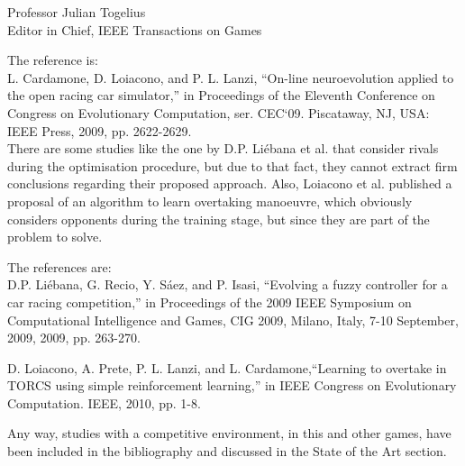 \documentclass[10pt]{letter} %
\begin{document}
\begin{letter}{Professor Julian Togelius \\ Editor in Chief, IEEE Transactions on Games}
\begin{enumerate}
\begin{itemize}
\begin{itemize}
The reference is:\\
L. Cardamone, D. Loiacono, and P. L. Lanzi, ``On-line neuroevolution
applied to the open racing car simulator,'' in Proceedings of the Eleventh
Conference on Congress on Evolutionary Computation, ser. CEC`09.
Piscataway, NJ, USA: IEEE Press, 2009, pp. 2622-2629.\\
		
There are some studies like the one by D.P. Li\'ebana et al. that consider rivals during the optimisation procedure, but due to that fact, they cannot extract firm conclusions regarding their proposed approach.
Also, Loiacono et al. published a proposal of an algorithm to learn overtaking manoeuvre, which obviously considers opponents during the training stage, but since they are part of the problem to solve.

The references are:\\
D.P. Li\'ebana, G. Recio, Y. S\'aez, and P. Isasi, ``Evolving a fuzzy
controller for a car racing competition,'' in Proceedings of the 2009
IEEE Symposium on Computational Intelligence and Games, CIG 2009,
Milano, Italy, 7-10 September, 2009, 2009, pp. 263-270.

D. Loiacono, A. Prete, P. L. Lanzi, and L. Cardamone,``Learning to
overtake in TORCS using simple reinforcement learning,'' in IEEE
Congress on Evolutionary Computation. IEEE, 2010, pp. 1-8.

Any way, studies with a competitive environment, in this and other
games, have been included in the bibliography and discussed in the
State of the Art section.


\end{itemize}
\end{itemize}
\end{enumerate}
\end{letter}
\end{document}
